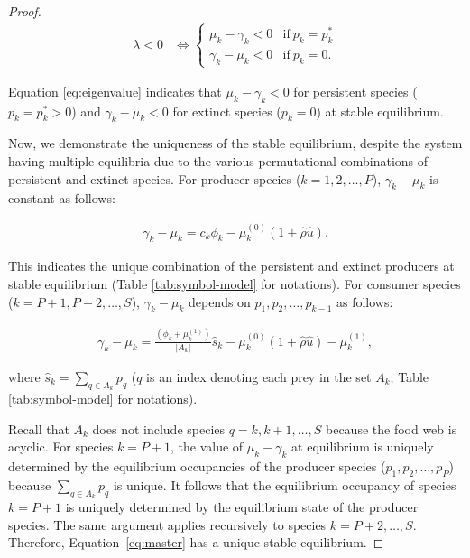 \documentclass[11pt, class=article, crop=false]{standalone}
\theoremstyle{definition}
\begin{document}
\begin{proof}
\begin{align}
    \lambda < 0 &\Leftrightarrow 
    \left\{
    \begin{array}{cc}
         \mu_k - \gamma_k < 0   &\text{if}~ p_k = p_k^*\\
         \gamma_k - \mu_k < 0   &\text{if}~ p_k = 0.
    \end{array}
    \right.
    \label{eq:eigenvalue}
\end{align}

Equation \ref{eq:eigenvalue} indicates that $\mu_k - \gamma_k < 0$ for persistent species ($p_k = p_k^*>0$) and $\gamma_k - \mu_k < 0$ for extinct species ($p_k=0$) at stable equilibrium.

Now, we demonstrate the uniqueness of the stable equilibrium, despite the system having multiple equilibria due to the various permutational combinations of persistent and extinct species.
For producer species ($k=1,2,\ldots, P$), $\gamma_k-\mu_k$ is constant as follows:

\begin{align}
    \gamma_k-\mu_k = c_{k}\phi_k - \mu_{k}^{(0)} (1 + \hat{\rho} \hat{u}).
\end{align}

This indicates the unique combination of the persistent and extinct producers at stable equilibrium (Table \ref{tab:symbol-model} for notations).
For consumer species ($k = P+1, P+2,\ldots, S$), $\gamma_k-\mu_k$ depends on $p_1, p_2, \ldots, p_{k-1}$ as follows:

\begin{align}
    \gamma_k-\mu_k 
    = 
    \frac{\left(\phi_{k}+\mu_{k}^{(1)}\right)}{|A_k|} \hat{s}_k
    - 
    \mu_{k}^{(0)} (1 + \hat{\rho} \hat{u})
    -
    \mu_{k}^{(1)} ,
\end{align}

where $\hat{s}_k = \sum_{q \in A_k} p_q$ ($q$ is an index denoting each prey in the set $A_k$; Table \ref{tab:symbol-model} for notations).

Recall that $A_k$ does not include species $q = k, k+1, \ldots, S$ because the food web is acyclic.
For species $k = P+1$, the value of $\mu_k - \gamma_k$ at equilibrium is uniquely determined by the equilibrium occupancies of the producer species ($p_1, p_2, \ldots, p_P$) because $\sum_{q \in A_k} p_q$ is unique.
It follows that the equilibrium occupancy of species $k = P+1$ is uniquely determined by the equilibrium state of the producer species.
The same argument applies recursively to species $k = P+2, \ldots, S$.
Therefore, Equation~\ref{eq:master} has a unique stable equilibrium.

\end{proof}
\end{document}
